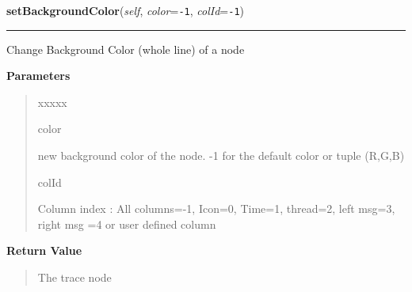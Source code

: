 \hspace{.8\funcindent}\begin{boxedminipage}{\funcwidth}

    \raggedright \textbf{setBackgroundColor}(\textit{self}, \textit{color}={\tt -1}, \textit{colId}={\tt -1})

    \vspace{-1.5ex}

    \rule{\textwidth}{0.5\fboxrule}
\setlength{\parskip}{2ex}
    Change Background Color (whole line) of a node

\setlength{\parskip}{1ex}
      \textbf{Parameters}
      \vspace{-1ex}

      \begin{quote}
        \begin{Ventry}{xxxxx}

          \item[color]

          new background color of the node. -1 for the default color or 
          tuple (R,G,B)

          \item[colId]

          Column index : All columns=-1, Icon=0, Time=1, thread=2, left 
          msg=3, right msg =4 or user defined column

        \end{Ventry}

      \end{quote}

      \textbf{Return Value}
    \vspace{-1ex}

      \begin{quote}
      The trace node

      \end{quote}

    \end{boxedminipage}

    \label{tracetool:TraceNode:setFontDetail}

    \vspace{0.5ex}

